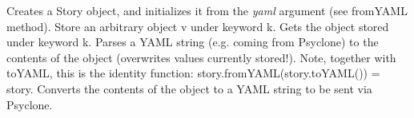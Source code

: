 \begin{interface}
    {Creates a Story object, and initializes it from the \emph{yaml} argument
      (see fromYAML method).}
    {Store an arbitrary object v under keyword k.}
    {Gets the object stored under keyword k.}
    {Parses a \ac{YAML} string (e.g. coming from Psyclone) to the contents of the
      object (overwrites values currently stored!). Note, together with toYAML,
      this is the identity function: story.fromYAML(story.toYAML()) = story.}
    {Converts the contents of the object to a \ac{YAML} string to be sent via
      Psyclone.}
\end{interface}

